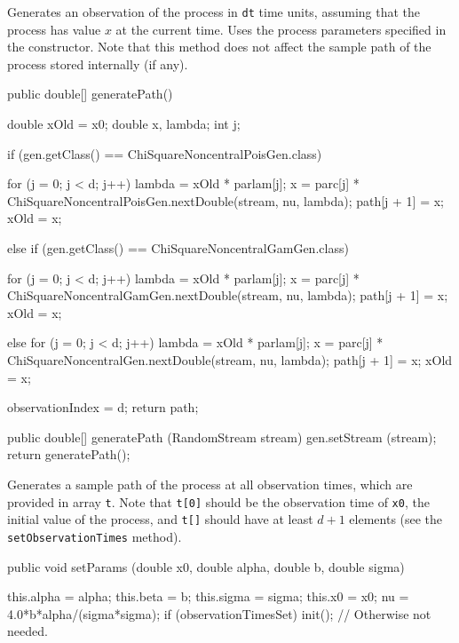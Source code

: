 \begin{tabb} Generates an observation of the process in \texttt{dt} time units,
assuming that the process has value $x$ at the current time.
Uses the process parameters specified in the constructor.
Note that this method does not affect the sample path of the process
stored internally (if any).
\end{tabb}
\begin{hide}\begin{code}

   public double[] generatePath() {
      double xOld = x0;
      double x, lambda;
      int j;

      if (gen.getClass() == ChiSquareNoncentralPoisGen.class) {
         for (j = 0; j < d; j++) {
            lambda = xOld * parlam[j];
            x = parc[j] * ChiSquareNoncentralPoisGen.nextDouble(stream, nu, lambda);
            path[j + 1] = x;
            xOld = x;
         }

      } else if (gen.getClass() == ChiSquareNoncentralGamGen.class) {
         for (j = 0; j < d; j++) {
            lambda = xOld * parlam[j];
            x = parc[j] * ChiSquareNoncentralGamGen.nextDouble(stream, nu, lambda);
            path[j + 1] = x;
            xOld = x;
         }

      } else {
         for (j = 0; j < d; j++) {
            lambda = xOld * parlam[j];
            x = parc[j] * ChiSquareNoncentralGen.nextDouble(stream, nu, lambda);
            path[j + 1] = x;
            xOld = x;
         }
      }

      observationIndex = d;
      return path;
   }

   public double[] generatePath (RandomStream stream) {
      gen.setStream (stream);
      return generatePath();
   }
\end{code}
\begin{tabb} Generates a sample path of the process at all observation times,
 which are provided in array \texttt{t}.
 Note that \texttt{t[0]} should be the observation time of \texttt{x0},
 the initial value of the process, and \texttt{t[]} should have at least $d+1$
 elements (see the \texttt{setObservationTimes} method).
\end{tabb}\end{hide}
\begin{code}

   public void setParams (double x0, double alpha, double b, double sigma) \begin{hide} {
      this.alpha = alpha;
      this.beta  = b;
      this.sigma = sigma;
      this.x0    = x0;
      nu = 4.0*b*alpha/(sigma*sigma);
      if (observationTimesSet) init(); // Otherwise not needed.
    }\end{hide}
\end{code}
